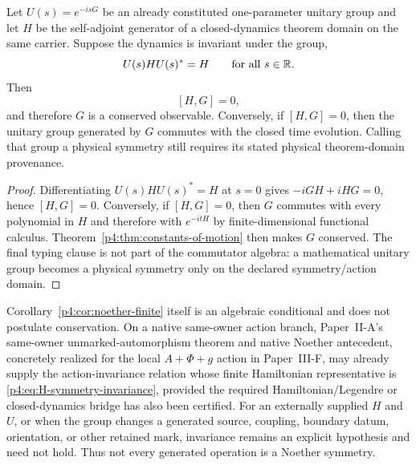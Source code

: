 \documentclass[12pt,a4paper]{article}
\begin{document}
\begin{corollary}
\label{p4:cor:noether-finite}
Let \(U(s)=e^{-isG}\) be an already constituted one-parameter unitary group
and let \(H\) be the self-adjoint generator of a closed-dynamics theorem
domain on the same carrier.  Suppose the dynamics is invariant under the
group,
\begin{equation}
\label{p4:eq:H-symmetry-invariance}
U(s)HU(s)^*=H
\qquad
\text{for all }s\in\mathbb{R}.
\end{equation}
Then
\[
 \boxed{[H,G]=0,}
\]
and therefore \(G\) is a conserved observable.  Conversely, if
\([H,G]=0\), then the unitary group generated by \(G\) commutes with the
closed time evolution.  Calling that group a physical symmetry still requires
its stated physical theorem-domain provenance.
\end{corollary}

\begin{proof}
Differentiating \(U(s)HU(s)^*=H\) at \(s=0\) gives
\(-iGH+iHG=0\), hence \([H,G]=0\).  Conversely, if \([H,G]=0\), then
\(G\) commutes with every polynomial in \(H\) and therefore with
\(e^{-itH}\) by finite-dimensional functional calculus.
Theorem~\ref{p4:thm:constants-of-motion} then makes \(G\) conserved.  The
final typing clause is not part of the commutator algebra: a mathematical
unitary group becomes a physical symmetry only on the declared
symmetry/action domain.
\end{proof}

\begin{remark}
\label{p4:rem:v458-native-supplied-noether}
Corollary~\ref{p4:cor:noether-finite} itself is an algebraic conditional and
does not postulate conservation.  On a native same-owner action branch,
Paper~II-A's same-owner unmarked-automorphism theorem and native Noether
antecedent, concretely realized for the local \(A+\Phi+g\) action in
Paper~III-F, may already supply the action-invariance relation whose finite
Hamiltonian representative is \eqref{p4:eq:H-symmetry-invariance}, provided
the required Hamiltonian/Legendre or closed-dynamics bridge has also been
certified.  For an externally supplied \(H\) and \(U\), or when the group
changes a generated source, coupling, boundary datum, orientation, or other
retained mark, invariance remains an explicit hypothesis and need not hold.
Thus not every generated operation is a Noether symmetry.
\end{remark}
\end{document}
